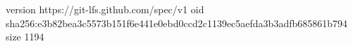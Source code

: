 version https://git-lfs.github.com/spec/v1
oid sha256:e3b82bea3c5573b151f6e441e0ebd0ccd2c1139ec5aefda3b3adfb685861b794
size 1194
